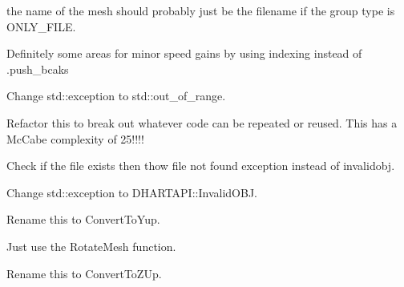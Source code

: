 
\begin{DoxyRefList}
\item[Member \mbox{\hyperlink{a00469_a06c0c11adb62f8b204e42f75ac1990ac}{HF\+::Geometry\+::Load\+Mesh\+Objects}} (std\+::string path, GROUP\+\_\+\+METHOD gm=ONLY\+\_\+\+FILE, bool change\+\_\+coords=false, int scale=1)]\label{a00452__todo000014}%
%
the name of the mesh should probably just be the filename if the group type is ONLY\+\_\+\+FILE. 



Definitely some areas for minor speed gains by using indexing instead of .push\+\_\+bcaks 



Change std\+::exception to std\+::out\+\_\+of\+\_\+range. 



Refactor this to break out whatever code can be repeated or reused. This has a Mc\+Cabe complexity of 25!!!! 
\item[Member \mbox{\hyperlink{a00469_aec1df746155d224838048d3a43c2fe96}{HF\+::Geometry\+::Load\+Raw\+Vertices}} (std\+::string path)]\label{a00452__todo000015}%
%
Check if the file exists then thow file not found exception instead of invalidobj. 
\item[Member \mbox{\hyperlink{a01351_a05d1a3ebca83e841e8902baaecc59930}{HF\+::Geometry\+::Mesh\+Info\texorpdfstring{$<$}{<} numeric\+\_\+type \texorpdfstring{$>$}{>}\+::Add\+Verts}} (const std\+::vector\texorpdfstring{$<$}{<} std\+::array$<$ numeric\+\_\+type, 3 $>$ \texorpdfstring{$>$}{>} \&verts)]\label{a00452__todo000009}%
%
Change std\+::exception to DHARTAPI\+::\+Invalid\+OBJ.  
\item[Member \mbox{\hyperlink{a01351_a5f067dbc661b07c1762b402da03f2041}{HF\+::Geometry\+::Mesh\+Info\texorpdfstring{$<$}{<} numeric\+\_\+type \texorpdfstring{$>$}{>}\+::Convert\+To\+OBJCoordinates}} ()]\label{a00452__todo000011}%
%
Rename this to Convert\+To\+Yup. 



Just use the Rotate\+Mesh function. 
\item[Member \mbox{\hyperlink{a01351_af1152233ddbd8fac736f761347e6d3b8}{HF\+::Geometry\+::Mesh\+Info\texorpdfstring{$<$}{<} numeric\+\_\+type \texorpdfstring{$>$}{>}\+::Convert\+To\+Rhino\+Coordinates}} ()]\label{a00452__todo000010}%
%
Rename this to Convert\+To\+ZUp. 




\end{DoxyRefList}
